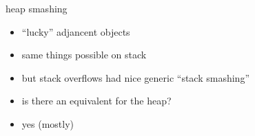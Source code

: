 
\begin{frame}{heap smashing}
    \begin{itemize}
    \item ``lucky'' adjancent objects
    \item same things possible on stack
    \item but stack overflows had nice generic ``stack smashing''
    \item is there an equivalent for the heap?
    \item yes (mostly)
    \end{itemize}
\end{frame}


